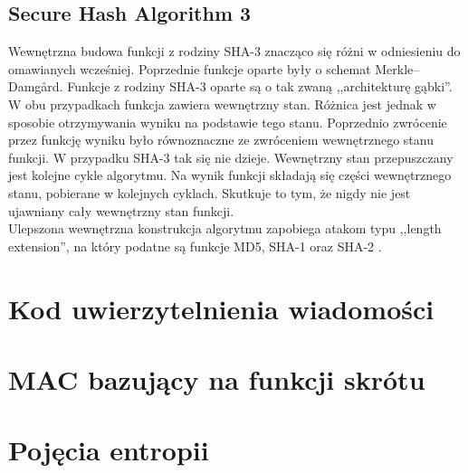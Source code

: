 \subsection{Secure Hash Algorithm 3}
Wewnętrzna budowa funkcji z rodziny SHA-3 znacząco się różni w odniesieniu do omawianych wcześniej. 
Poprzednie funkcje oparte były o schemat Merkle–Damgård. Funkcje z rodziny SHA-3 oparte są o tak zwaną ,,architekturę gąbki''. W obu przypadkach funkcja zawiera wewnętrzny stan. Różnica jest jednak w sposobie otrzymywania wyniku na podstawie tego stanu. Poprzednio zwrócenie przez funkcję wyniku było równoznaczne ze zwróceniem wewnętrznego stanu funkcji. W przypadku SHA-3 tak się nie dzieje. Wewnętrzny stan przepuszczany jest kolejne cykle algorytmu. Na wynik funkcji składają się części wewnętrznego stanu, pobierane w kolejnych cyklach. Skutkuje to tym, że nigdy nie jest ujawniany cały wewnętrzny stan funkcji. \\
Ulepszona wewnętrzna konstrukcja algorytmu zapobiega atakom typu ,,length extension'', na który podatne są funkcje MD5, SHA-1 oraz SHA-2 \cite{keccak}.

\section{Kod uwierzytelnienia wiadomości}

\section{MAC bazujący na funkcji skrótu}

\section{Pojęcia entropii}

